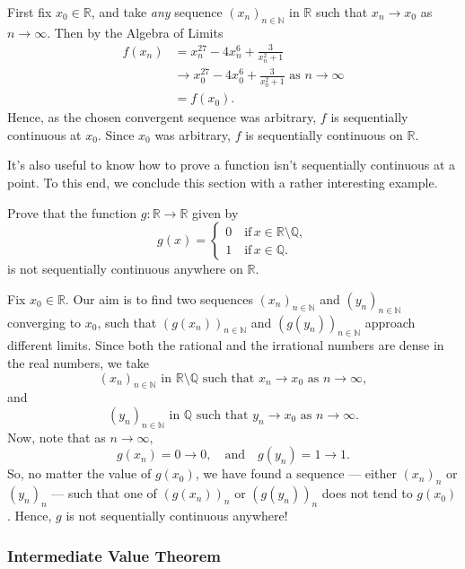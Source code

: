 \documentclass[
  17pt,
  a4paper]{extarticle}
\theoremstyle{plain}
\theoremstyle{plain}
\theoremstyle{plain}
\theoremstyle{plain}
\theoremstyle{plain}
\theoremstyle{definition}
\theoremstyle{definition}
\theoremstyle{definition}
\theoremstyle{remark}
\let\BeginKnitrBlock\begin \let\EndKnitrBlock\end
\renewcommand{\;}{\,}
\begin{document}
\BeginKnitrBlock{solution*}
First fix \(x_0 \in \mathbb{R}\), and take \emph{any} sequence \((x_n)_{n\in\mathbb{N}}\) in \(\mathbb{R}\) such that \(x_n \to x_0\) as \(n \to \infty\). Then by the Algebra of Limits
\begin{align*}
f(x_n) &= x_n^{27} - 4x_n^{6} + \frac{3}{x_n^2 +1}\\
&\to x_0^{27} - 4x_0^6 + \frac{3}{x_0^2 + 1}\; \; \text{as $n \to \infty$}\\
& = f(x_0).
\end{align*}
Hence, as the chosen convergent sequence was arbitrary, \(f\) is sequentially continuous at \(x_0\). Since \(x_0\) was arbitrary, \(f\) is sequentially continuous on \(\mathbb{R}\).
\EndKnitrBlock{solution*}

It's also useful to know how to prove a function isn't sequentially continuous at a point. To this end, we conclude this section with a rather interesting example.
\BeginKnitrBlock{example}
{\label{exm:ex2} }Prove that the function \(g: \mathbb{R} \to \mathbb{R}\) given by \[g(x) = \begin{cases}
0 \quad \text{if} \; x \in \mathbb{R}\setminus\mathbb{Q},\\
1 \quad \text{if} \; x \in \mathbb{Q}.
\end{cases}\] is not sequentially continuous anywhere on \(\mathbb{R}\).
\EndKnitrBlock{example}

\BeginKnitrBlock{solution*}
Fix \(x_0 \in \mathbb{R}\). Our aim is to find two sequences \((x_n)_{n\in\mathbb{N}}\) and \((y_n)_{n\in\mathbb{N}}\) converging to \(x_0\), such that \(\left(g(x_n)\right)_{n\in\mathbb{N}}\) and \(\left(g(y_n)\right)_{n\in\mathbb{N}}\) approach different limits. Since both the rational and the irrational numbers are dense in the real numbers, we take \[(x_n)_{n\in\mathbb{N}}\;\; \text{in}\;\; \mathbb{R}\setminus\mathbb{Q} \;\; \text{such that} \;\; x_n \to x_0 \;\; \text{as}\;\; n \to \infty,\] and \[(y_n)_{n\in\mathbb{N}}\;\; \text{in}\;\; \mathbb{Q} \;\; \text{such that} \;\; y_n \to x_0 \;\; \text{as}\;\; n \to \infty.\] Now, note that as \(n \to \infty,\) \[g(x_n) = 0 \to 0, \quad \text{and} \quad g(y_n) = 1 \to 1.\] So, no matter the value of \(g(x_0)\), we have found a sequence --- either \((x_n)_n\) or \((y_n)_n\) --- such that one of \(\left(g(x_n)\right)_n\) or \(\left(g(y_n)\right)_n\) does not tend to \(g(x_0)\). Hence, \(g\) is not sequentially continuous anywhere!
\EndKnitrBlock{solution*}

\hypertarget{intermediate-value-theorem}{%
\subsubsection{Intermediate Value Theorem}\label{intermediate-value-theorem}}
\end{document}
